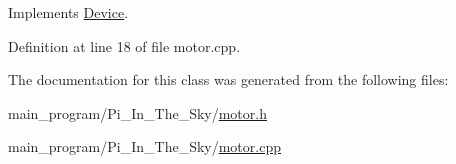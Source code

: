 Implements \hyperlink{class_device_aab20e3f9dc696c6a1153776d526dcc0b}{Device}.



Definition at line 18 of file motor.\+cpp.



The documentation for this class was generated from the following files\+:\begin{DoxyCompactItemize}
\item 
main\+\_\+program/\+Pi\+\_\+\+In\+\_\+\+The\+\_\+\+Sky/\hyperlink{motor_8h}{motor.\+h}\item 
main\+\_\+program/\+Pi\+\_\+\+In\+\_\+\+The\+\_\+\+Sky/\hyperlink{motor_8cpp}{motor.\+cpp}\end{DoxyCompactItemize}
